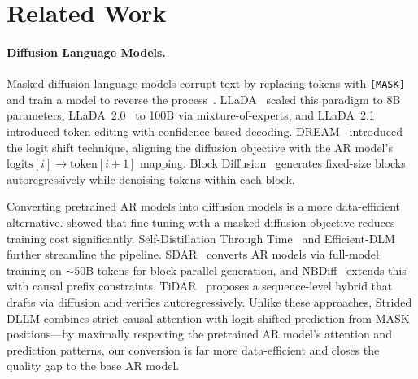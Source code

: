 \section{Related Work}
\label{sec:related}


\paragraph{Diffusion Language Models.}
Masked diffusion language models corrupt text by replacing tokens with \texttt{[MASK]} and train a model to reverse the process~\citep{austin2021d3pm, sahoo2024mdlm, lou2024sedd}.
LLaDA~\citep{nie2025llada} scaled this paradigm to 8B parameters, LLaDA~2.0~\citep{llada2} to 100B via mixture-of-experts, and LLaDA~2.1~\citep{llada21} introduced token editing with confidence-based decoding.
DREAM~\citep{dream2025} introduced the logit shift technique, aligning the diffusion objective with the AR model's $\text{logits}[i] \to \text{token}[i{+}1]$ mapping.
Block Diffusion~\citep{blockdiffusion2025} generates fixed-size blocks autoregressively while denoising tokens within each block.

Converting pretrained AR models into diffusion models is a more data-efficient alternative.
\citet{shi2024scaling} showed that fine-tuning with a masked diffusion objective reduces training cost significantly.
Self-Distillation Through Time~\citep{hou2024sdtt} and Efficient-DLM~\citep{efficientdlm2025} further streamline the pipeline.
SDAR~\citep{sdar2025} converts AR models via full-model training on ${\sim}$50B tokens for block-parallel generation, and NBDiff~\citep{nbdiff2025} extends this with causal prefix constraints.
TiDAR~\citep{tidar2025} proposes a sequence-level hybrid that drafts via diffusion and verifies autoregressively.
Unlike these approaches, Strided DLLM combines strict causal attention with logit-shifted prediction from MASK positions---by maximally respecting the pretrained AR model's attention and prediction patterns, our conversion is far more data-efficient and closes the quality gap to the base AR model.


